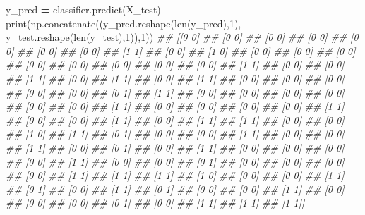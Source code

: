 \documentclass[
]{book}
\newenvironment{Shaded}{\begin{snugshade}}{\end{snugshade}}
\newcommand{\BuiltInTok}[1]{#1}
\newcommand{\CommentTok}[1]{\textcolor[rgb]{0.56,0.35,0.01}{\textit{#1}}}
\newcommand{\DecValTok}[1]{\textcolor[rgb]{0.00,0.00,0.81}{#1}}
\newcommand{\NormalTok}[1]{#1}
\newcommand{\OperatorTok}[1]{\textcolor[rgb]{0.81,0.36,0.00}{\textbf{#1}}}
\theoremstyle{definition}
\theoremstyle{definition}
\theoremstyle{definition}
\theoremstyle{definition}
\theoremstyle{remark}
\begin{document}
\begin{Shaded}
\begin{Highlighting}[]
\NormalTok{y\_pred }\OperatorTok{=}\NormalTok{ classifier.predict(X\_test)}
\BuiltInTok{print}\NormalTok{(np.concatenate((y\_pred.reshape(}\BuiltInTok{len}\NormalTok{(y\_pred),}\DecValTok{1}\NormalTok{), y\_test.reshape(}\BuiltInTok{len}\NormalTok{(y\_test),}\DecValTok{1}\NormalTok{)),}\DecValTok{1}\NormalTok{))}
\CommentTok{\#\# [[0 0]}
\CommentTok{\#\#  [0 0]}
\CommentTok{\#\#  [0 0]}
\CommentTok{\#\#  [0 0]}
\CommentTok{\#\#  [0 0]}
\CommentTok{\#\#  [0 0]}
\CommentTok{\#\#  [0 0]}
\CommentTok{\#\#  [1 1]}
\CommentTok{\#\#  [0 0]}
\CommentTok{\#\#  [1 0]}
\CommentTok{\#\#  [0 0]}
\CommentTok{\#\#  [0 0]}
\CommentTok{\#\#  [0 0]}
\CommentTok{\#\#  [0 0]}
\CommentTok{\#\#  [0 0]}
\CommentTok{\#\#  [0 0]}
\CommentTok{\#\#  [0 0]}
\CommentTok{\#\#  [0 0]}
\CommentTok{\#\#  [1 1]}
\CommentTok{\#\#  [0 0]}
\CommentTok{\#\#  [0 0]}
\CommentTok{\#\#  [1 1]}
\CommentTok{\#\#  [0 0]}
\CommentTok{\#\#  [1 1]}
\CommentTok{\#\#  [0 0]}
\CommentTok{\#\#  [1 1]}
\CommentTok{\#\#  [0 0]}
\CommentTok{\#\#  [0 0]}
\CommentTok{\#\#  [0 0]}
\CommentTok{\#\#  [0 0]}
\CommentTok{\#\#  [0 0]}
\CommentTok{\#\#  [0 1]}
\CommentTok{\#\#  [1 1]}
\CommentTok{\#\#  [0 0]}
\CommentTok{\#\#  [0 0]}
\CommentTok{\#\#  [0 0]}
\CommentTok{\#\#  [0 0]}
\CommentTok{\#\#  [0 0]}
\CommentTok{\#\#  [0 0]}
\CommentTok{\#\#  [1 1]}
\CommentTok{\#\#  [0 0]}
\CommentTok{\#\#  [0 0]}
\CommentTok{\#\#  [0 0]}
\CommentTok{\#\#  [0 0]}
\CommentTok{\#\#  [1 1]}
\CommentTok{\#\#  [0 0]}
\CommentTok{\#\#  [0 0]}
\CommentTok{\#\#  [1 1]}
\CommentTok{\#\#  [0 0]}
\CommentTok{\#\#  [1 1]}
\CommentTok{\#\#  [1 1]}
\CommentTok{\#\#  [0 0]}
\CommentTok{\#\#  [0 0]}
\CommentTok{\#\#  [1 0]}
\CommentTok{\#\#  [1 1]}
\CommentTok{\#\#  [0 1]}
\CommentTok{\#\#  [0 0]}
\CommentTok{\#\#  [0 0]}
\CommentTok{\#\#  [1 1]}
\CommentTok{\#\#  [0 0]}
\CommentTok{\#\#  [0 0]}
\CommentTok{\#\#  [1 1]}
\CommentTok{\#\#  [0 0]}
\CommentTok{\#\#  [0 1]}
\CommentTok{\#\#  [0 0]}
\CommentTok{\#\#  [1 1]}
\CommentTok{\#\#  [0 0]}
\CommentTok{\#\#  [0 0]}
\CommentTok{\#\#  [0 0]}
\CommentTok{\#\#  [0 0]}
\CommentTok{\#\#  [1 1]}
\CommentTok{\#\#  [0 0]}
\CommentTok{\#\#  [0 0]}
\CommentTok{\#\#  [0 1]}
\CommentTok{\#\#  [0 0]}
\CommentTok{\#\#  [0 0]}
\CommentTok{\#\#  [0 0]}
\CommentTok{\#\#  [0 0]}
\CommentTok{\#\#  [1 1]}
\CommentTok{\#\#  [1 1]}
\CommentTok{\#\#  [1 1]}
\CommentTok{\#\#  [1 0]}
\CommentTok{\#\#  [0 0]}
\CommentTok{\#\#  [0 0]}
\CommentTok{\#\#  [1 1]}
\CommentTok{\#\#  [0 1]}
\CommentTok{\#\#  [0 0]}
\CommentTok{\#\#  [1 1]}
\CommentTok{\#\#  [0 1]}
\CommentTok{\#\#  [0 0]}
\CommentTok{\#\#  [0 0]}
\CommentTok{\#\#  [1 1]}
\CommentTok{\#\#  [0 0]}
\CommentTok{\#\#  [0 0]}
\CommentTok{\#\#  [0 0]}
\CommentTok{\#\#  [0 1]}
\CommentTok{\#\#  [0 0]}
\CommentTok{\#\#  [1 1]}
\CommentTok{\#\#  [1 1]}
\CommentTok{\#\#  [1 1]]}
\end{Highlighting}
\end{Shaded}
\end{document}
